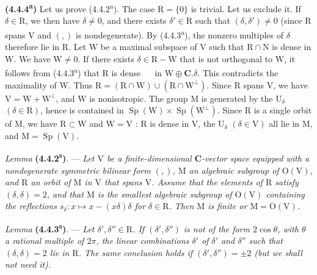 \documentclass[11pt,leqno]{article}
\newcommand{\Page}[1]{\ifvmode\noindent\else\unskip\ \fi{\footnotesize\textcolor{gray}{[p.\,#1]}}\ \ignorespaces}
\begin{document}
\textbf{(4.4.4\textsuperscript{a})} Let us prove (4.4.2\textsuperscript{a}). The case \(\mathrm{R}=\{0\}\) is trivial. Let us exclude it. If \(\delta\in\mathrm{R}\), we then have \(\delta\neq0\), and there exists \(\delta'\in\mathrm{R}\) such that \((\delta,\delta')\neq0\) (since \(\mathrm{R}\) spans \(\mathrm{V}\) and \((,)\) is nondegenerate). By (4.4.3\textsuperscript{a}), the nonzero multiples of \(\delta\) therefore lie in \(\mathrm{R}\). Let \(\mathrm{W}\) be a maximal subspace of \(\mathrm{V}\) such that \(\mathrm{R}\cap\mathrm{N}\) is dense in \(\mathrm{W}\). We have \(\mathrm{W}\neq0\). If there exists \(\delta\in\mathrm{R}-\mathrm{W}\) that is not orthogonal to \(\mathrm{W}\), it follows from (4.4.3\textsuperscript{a}) that \(\mathrm{R}\) is dense
\Page{228}
in \(\mathrm{W}\oplus\mathbf{C}.\delta\). This contradicts the maximality of \(\mathrm{W}\). Thus \(\mathrm{R}=(\mathrm{R}\cap\mathrm{W})\cup(\mathrm{R}\cap\mathrm{W}^{\perp})\). Since \(\mathrm{R}\) spans \(\mathrm{V}\), we have \(\mathrm{V}=\mathrm{W}+\mathrm{W}^{\perp}\), and \(\mathrm{W}\) is nonisotropic. The group \(\mathrm{M}\) is generated by the \(\mathrm{U}_\delta\) \((\delta\in\mathrm{R})\), hence is contained in \(\operatorname{Sp}(\mathrm{W})\times\operatorname{Sp}(\mathrm{W}^{\perp})\). Since \(\mathrm{R}\) is a single orbit of \(\mathrm{M}\), we have \(\mathrm{R}\subset\mathrm{W}\) and \(\mathrm{W}=\mathrm{V}\) : \(\mathrm{R}\) is dense in \(\mathrm{V}\), the \(\mathrm{U}_\delta\) \((\delta\in\mathrm{V})\) all lie in \(\mathrm{M}\), and \(\mathrm{M}=\operatorname{Sp}(\mathrm{V})\).

\textit{Lemma} \textbf{(4.4.2\textsuperscript{s})}. — \textit{Let \(\mathrm{V}\) be a finite-dimensional \(\mathbf{C}\)-vector space equipped with a nondegenerate symmetric bilinear form \((,)\), \(\mathrm{M}\) an algebraic subgroup of \(\mathrm{O}(\mathrm{V})\), and \(\mathrm{R}\) an orbit of \(\mathrm{M}\) in \(\mathrm{V}\) that spans \(\mathrm{V}\). Assume that the elements of \(\mathrm{R}\) satisfy \((\delta,\delta)=2\), and that \(\mathrm{M}\) is the smallest algebraic subgroup of \(\mathrm{O}(\mathrm{V})\) containing the reflections \(s_\delta:x\mapsto x-(x\delta)\delta\) for \(\delta\in\mathrm{R}\). Then \(\mathrm{M}\) is finite or \(\mathrm{M}=\mathrm{O}(\mathrm{V})\).}

\textit{Lemma} \textbf{(4.4.3\textsuperscript{s})}. — \textit{Let \(\delta',\delta''\in\mathrm{R}\). If \((\delta',\delta'')\) is not of the form \(2\cos\theta\), with \(\theta\) a rational multiple of \(2\pi\), the linear combinations \(\delta'\) of \(\delta'\) and \(\delta''\) such that \((\delta,\delta)=2\) lie in \(\mathrm{R}\). The same conclusion holds if \((\delta',\delta'')=\pm2\) (but we shall not need it).}
\end{document}
